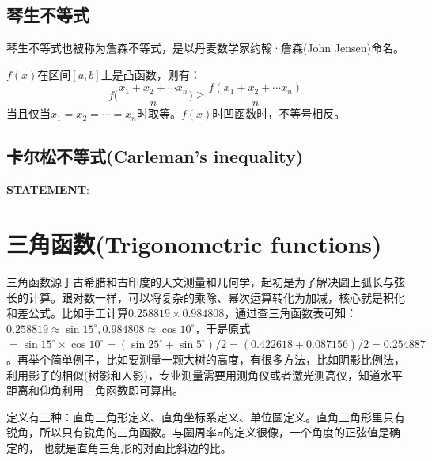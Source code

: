 \documentclass[../main.tex]{subfiles}
\begin{document}
\subsection{琴生不等式}
琴生不等式也被称为詹森不等式，是以丹麦数学家约翰·詹森(John Jensen)命名。

$f(x)$在区间$[a,b]$上是凸函数，则有：
$$ f\big(\frac{x_1+x_2+\cdots x_n}{n}\big) \ge \frac{f(x_1+x_2+\cdots x_n)}{n} $$
当且仅当$x_1=x_2=\cdots =x_n$时取等。$f(x)$时凹函数时，不等号相反。

\subsection{卡尔松不等式(Carleman's inequality)}
\begin{mdframed}
  \textbf{STATEMENT}:\\
\end{mdframed}

\clearpage
\section{三角函数(Trigonometric functions)}
三角函数源于古希腊和古印度的天文测量和几何学，起初是为了解决圆上弧长与弦长的计算。跟对数一样，可以将复杂的乘除、幂次运算转化为加减，核心就是积化和差公式。比如手工计算$0.258819\times 0.984808$，通过查三角函数表可知：$0.258819\approx \sin15^{\circ}, 0.984808\approx \cos 10^{\circ}$，于是原式$=\sin15^{\circ}\times\cos10^{\circ}=(\sin25^{\circ}+\sin5^{\circ})/2=(0.422618+0.087156)/2=0.254887$。再举个简单例子，比如要测量一颗大树的高度，有很多方法，比如阴影比例法，利用影子的相似(树影和人影)，专业测量需要用测角仪或者激光测高仪，知道水平距离和仰角利用三角函数即可算出。

定义有三种：直角三角形定义、直角坐标系定义、单位圆定义。直角三角形里只有锐角，所以只有锐角的三角函数。与圆周率$\pi$的定义很像，一个角度的正弦值是确定的， 也就是直角三角形的对面比斜边的比。
\end{document}
